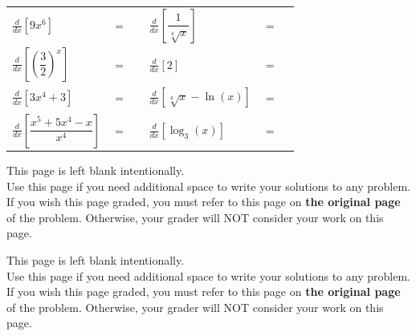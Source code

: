 \documentclass[11pt]{article}
\begin{document}
\begin{enumerate}
\begin{center}
        \begin{tabular}{l c r l c r}
            $\displaystyle\frac{d}{dx}\left[ 9x^{6} \right]$ & $=$ & \rule[-8pt]{1.5in}{0.4pt} &
            $\displaystyle\frac{d}{dx}\left[ \dfrac{1}{\sqrt[4]{x}} \right]$ & $=$ & \rule[-8pt]{1.5in}{0.4pt}\\[0.3in]
            $\displaystyle\frac{d}{dx}\left[ \left(\dfrac{3}{2}\right)^x \right]$ & $=$ & \rule[-8pt]{1.5in}{0.4pt} & 
            $\displaystyle\frac{d}{dx}\left[ 2 \right]$ & $=$ & \rule[-8pt]{1.5in}{0.4pt}\\[0.3in]
            $\displaystyle\frac{d}{dx}\left[ 3x^4+3 \right]$ & $=$ & \rule[-8pt]{1.5in}{0.4pt}&
            $\displaystyle\frac{d}{dx}\left[ \sqrt[4]{x}-\ln(x) \right]$ & $=$ & \rule[-8pt]{1.5in}{0.4pt}\\[0.3in]
            $\displaystyle\frac{d}{dx}\left[ \dfrac{x^5+5x^4-x}{x^4} \right]$ & $=$ & \rule[-8pt]{1.5in}{0.4pt} & 
            $\displaystyle\frac{d}{dx}\left[ \log_{3}(x) \right]$ & $=$ & \rule[-8pt]{1.5in}{0.4pt}\\[0.3in]
        \end{tabular}
        
\end{center}



\newpage

This page is left blank intentionally.\\

Use this page if you need additional space to write your solutions to any problem. \\

If you wish this page graded, you must refer to this page on \textbf{the original page} of the problem. Otherwise, your grader will NOT consider your work on this page.

\newpage

This page is left blank intentionally.\\

Use this page if you need additional space to write your solutions to any problem. \\

If you wish this page graded, you must refer to this page on \textbf{the original page} of the problem. Otherwise, your grader will NOT consider your work on this page.

\end{enumerate}
\end{document}
